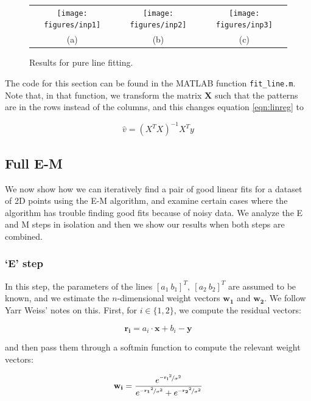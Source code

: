 \documentclass[11pt]{article} %
\begin{document}
\begin{figure}[H]
\centering
	\begin{tabular}{c c c}
		\texttt{[image: figures/inp1]} &
		\texttt{[image: figures/inp2]} &
		\texttt{[image: figures/inp3]}   \\ 
		(a) & (b) & (c) 
	\end{tabular}
	\caption{Results for pure line fitting.}
	\label{fig:lineFitting}
\end{figure}

The code for this section can be found in the MATLAB function \texttt{fit\_line.m}. Note that, in that function, we transform the matrix $\textbf{X}$
such that the patterns are in the rows instead of the columns, and this changes equation \ref{eqn:linreg} to 

\begin{equation*}
	\hat{v} = (X^T X) ^{-1}  X^Ty
\end{equation*}
\subsection{Full E-M}

We now show how we can iteratively find a pair of good linear fits for a dataset of 2D points using the E-M algorithm, and examine certain cases where the algorithm has trouble finding good fits because of noisy data. We analyze the E and M steps in isolation and then we show our results when both steps are combined.

\subsubsection{`E' step}

In this step, the parameters of the lines $[a_1\ b_1]^T,\ [a_2\ b_2]^T$ are assumed to be known, and we estimate the $n$-dimensional weight vectors $\mathbf{w_1}$ and $\mathbf{w_2}$. We follow Yarr Weiss' notes on this. First, for $i \in \lbrace1, 2 \rbrace$, we compute the residual vectors:

\begin{equation}
	\mathbf{r_i} = a_i \cdot \mathbf{x} +  b_i - \mathbf{y} 
	\label{eqn:res}
\end{equation}

and then pass them through a softmin function to compute the relevant weight vectors:

\begin{equation}
	\mathbf{w_i} = \frac{e^{\nicefrac{-\mathbf{r_i}^2}{\sigma^2}}}{e^{\nicefrac{-\mathbf{r_1}^2}{\sigma^2}} + e^{\nicefrac{-\mathbf{r_2}^2}{\sigma^2}}}
	\label{eqn:softmin}
\end{equation}
\end{document}
